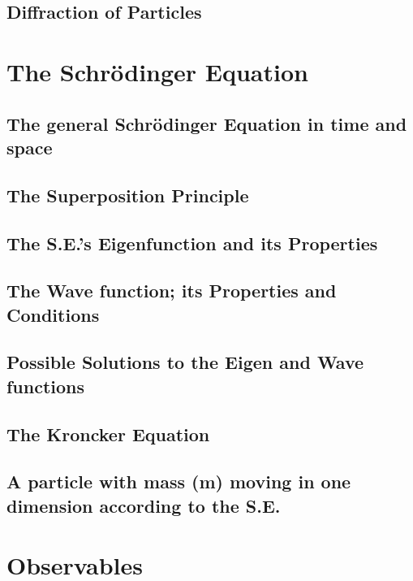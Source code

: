 \documentclass[colorlinks,11pt,a4paper,normalphoto,withhyper,ragged2e]{altareport}
\begin{document}
	
	\subsection{Diffraction of Particles}
	
	
	\pagebreak
	
	
	
	
\section{The Schrödinger Equation}
	
	\subsection{The general Schrödinger Equation in time and space}
	
	
	\subsection{The Superposition Principle}
	
	
	\subsection{The S.E.’s Eigenfunction and its Properties}
	
	
	\subsection{The Wave function; its Properties and Conditions}
	
	
	\subsection{Possible Solutions to the Eigen and Wave functions}
	
	
	\subsection{The Kroncker Equation}
	
	
	\subsection{A particle with mass (m) moving in one dimension according to the S.E.}
	
	
	\pagebreak
	
	
	
	
\section{Observables}
	
\end{document}
